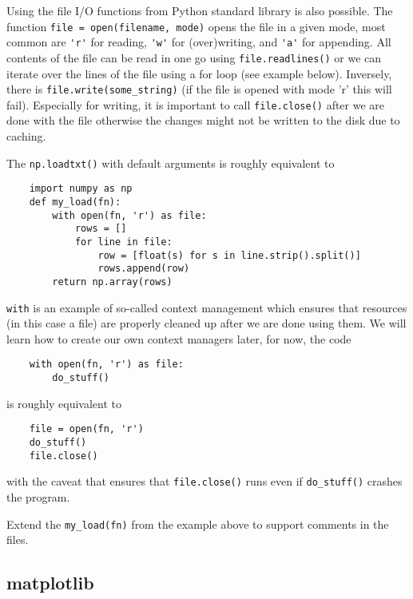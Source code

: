 Using the file I/O functions from Python standard library is also possible. The function \lstinline{file = open(filename, mode)} opens the file in a given mode, most common are \lstinline{'r'} for reading, \lstinline{'w'} for (over)writing, and \lstinline{'a'} for appending. All contents of the file can be read in one go using \lstinline{file.readlines()} or we can iterate over the lines of the file using a for loop (see example below). Inversely, there is \lstinline{file.write(some_string)} (if the file is opened with mode 'r' this will fail). Especially for writing, it is important to call \lstinline{file.close()} after we are done with the file otherwise the changes might not be written to the disk due to caching.

The \lstinline{np.loadtxt()} with default arguments is roughly equivalent to
\begin{lstlisting}
    import numpy as np
    def my_load(fn):
        with open(fn, 'r') as file:
            rows = []
            for line in file:
                row = [float(s) for s in line.strip().split()]
                rows.append(row)
        return np.array(rows)
\end{lstlisting}
\begin{syntax}
\lstinline{with} is an example of so-called context management which ensures that resources (in this case a file) are properly cleaned up after we are done using them. We will learn how to create our own context managers later, for now, the code
\begin{lstlisting}
    with open(fn, 'r') as file:
        do_stuff()
\end{lstlisting}
    is roughly equivalent to
\begin{lstlisting}
    file = open(fn, 'r')
    do_stuff()
    file.close()
\end{lstlisting}
with the caveat that  ensures that \lstinline{file.close()} runs even if \lstinline{do_stuff()} crashes the program.
\end{syntax}

\begin{exercise}
    Extend the \lstinline{my_load(fn)} from the example above to support comments in the files.
\end{exercise}

\subsection{matplotlib}

